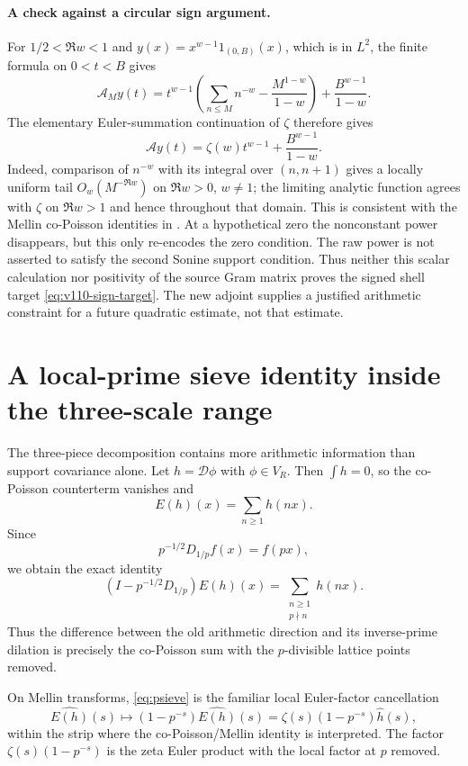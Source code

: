 \documentclass[11pt]{article}
\theoremstyle{remark}
\begin{document}
\paragraph{A check against a circular sign argument.}
For $1/2<\Re w<1$ and $y(x)=x^{w-1}1_{(0,B)}(x)$, which is in $L^2$,
the finite formula on $0<t<B$ gives
\[
 \mathscr A_My(t)=t^{w-1}
 \left(\sum_{n\le M}n^{-w}-\frac{M^{1-w}}{1-w}\right)
                  +\frac{B^{w-1}}{1-w}.
\]
The elementary Euler-summation continuation of $\zeta$ therefore gives
\begin{equation}\label{eq:v111-power-response}
 \mathscr Ay(t)=\zeta(w)t^{w-1}+\frac{B^{w-1}}{1-w}.
\end{equation}
Indeed, comparison of $n^{-w}$ with its integral over $(n,n+1)$
gives a locally uniform tail $O_w(M^{-\Re w})$ on $\Re w>0$,
$w\ne1$; the limiting analytic function agrees with $\zeta$ on
$\Re w>1$ and hence throughout that domain.
This is consistent with the Mellin co-Poisson identities in
\cite{Burnol2004,BurnolCoPoisson2004}. At a hypothetical zero the
nonconstant power disappears, but this only re-encodes the zero condition.
The raw power is not asserted to satisfy the second Sonine support
condition. Thus neither this scalar calculation nor positivity of the
source Gram matrix proves the signed shell target
\eqref{eq:v110-sign-target}. The new adjoint supplies a justified
arithmetic constraint for a future quadratic estimate, not that estimate.

\section{A local-prime sieve identity inside the three-scale range}
The three-piece decomposition contains more arithmetic information than support covariance alone. Let $h=\mathcal D\phi$ with $\phi\in V_R$. Then $\int h=0$, so the co-Poisson counterterm vanishes and
\[
 E(h)(x)=\sum_{n\ge1}h(nx).
\]
Since
\[
 p^{-1/2}D_{1/p}f(x)=f(px),
\]
we obtain the exact identity
\begin{equation}\label{eq:psieve}
 \boxed{
 \left(I-p^{-1/2}D_{1/p}\right)E(h)(x)
 =\sum_{\substack{n\ge1\\ p\nmid n}}h(nx).}
\end{equation}
Thus the difference between the old arithmetic direction and its inverse-prime dilation is precisely the co-Poisson sum with the $p$-divisible lattice points removed.

On Mellin transforms, \eqref{eq:psieve} is the familiar local Euler-factor cancellation
\begin{equation}\label{eq:eulerremove}
 \widehat{E(h)}(s)\longmapsto
 (1-p^{-s})\widehat{E(h)}(s)
 =\zeta(s)(1-p^{-s})\widehat h(s),
\end{equation}
within the strip where the co-Poisson/Mellin identity is interpreted. The factor $\zeta(s)(1-p^{-s})$ is the zeta Euler product with the local factor at $p$ removed.
\end{document}
